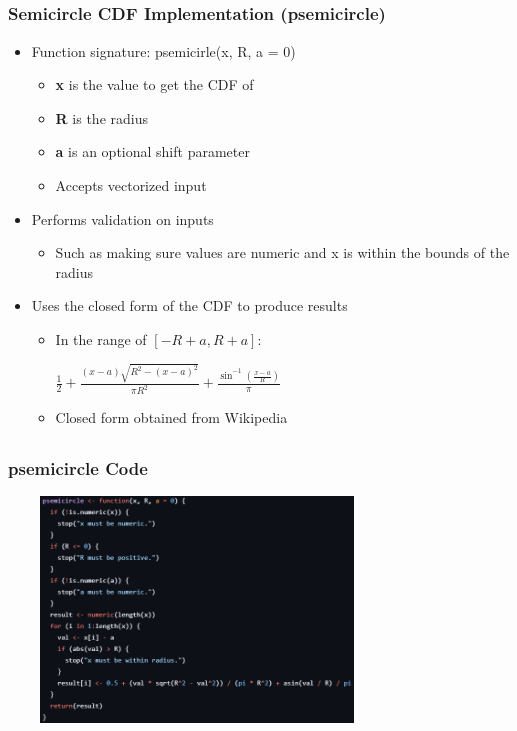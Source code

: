 \documentclass[handout, xcolor=dvipsnames]{beamer}
\begin{document}
\subsection{}
\begin{frame}
	\frametitle{Semicircle CDF Implementation (psemicircle)}
        \begin{itemize}
            \item Function signature: psemicirle(x, R, a = 0)
            \begin{itemize}
                \item \textbf{x} is the value to get the CDF of
                \item \textbf{R} is the radius
                \item \textbf{a} is an optional shift parameter
                \item Accepts vectorized input
            \end{itemize}
            \item Performs validation on inputs
            \begin{itemize}
                \item Such as making sure values are numeric and x is within the bounds of the radius
            \end{itemize}
            \item Uses the closed form of the CDF to produce results
            \begin{itemize}
                \item In the range of $[-R+a, R+a]$:
                \begin{center}
                    $\frac{1}{2}+\frac{(x-a)\sqrt{R^2-(x-a)^2}}{\pi R^2}+\frac{\sin^{-1}(\frac{x-a}{R})}{\pi}$
                \end{center}
                \item Closed form obtained from Wikipedia
            \end{itemize}
        \end{itemize}
\end{frame}


\subsection{}
\begin{frame}
	\frametitle{psemicircle Code}
        \begin{center}
            \includegraphics[width=10cm,height=6cm]{Figures/psemi_code.png}
        \end{center}
\end{frame}
\end{document}
